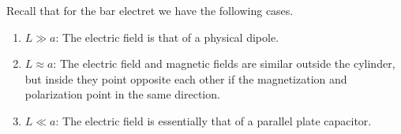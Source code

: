 \documentclass[12pt,a4paper]{article}
\begin{document}
Recall that for the bar electret we have the following cases.
\begin{enumerate}
    \item $L \gg a$: The electric field is that of a physical dipole.
    \item $L \approx a$: The electric field and magnetic fields are similar outside the cylinder, but inside they point opposite each other if the magnetization and polarization point in the same direction.
    \item $ L \ll a$: The electric field is essentially that of a parallel plate capacitor.
\end{enumerate}
\end{document}
